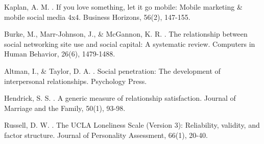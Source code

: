 \documentclass[12pt,a4paper]{article}
\begin{document}

\begin{thebibliography}{99}

Kaplan, A. M. . If you love something, let it go mobile: Mobile marketing \& mobile social media 4x4. Business Horizons, 56(2), 147-155.

Burke, M., Marr-Johnson, J., \& McGannon, K. R. . The relationship between social networking site use and social capital: A systematic review. Computers in Human Behavior, 26(6), 1479-1488.

Altman, I., \& Taylor, D. A. . Social penetration: The development of interpersonal relationships. Psychology Press.

Hendrick, S. S. . A generic measure of relationship satisfaction. Journal of Marriage and the Family, 50(1), 93-98.

Russell, D. W. . The UCLA Loneliness Scale (Version 3): Reliability, validity, and factor structure. Journal of Personality Assessment, 66(1), 20-40.

\end{thebibliography}
\end{document}
